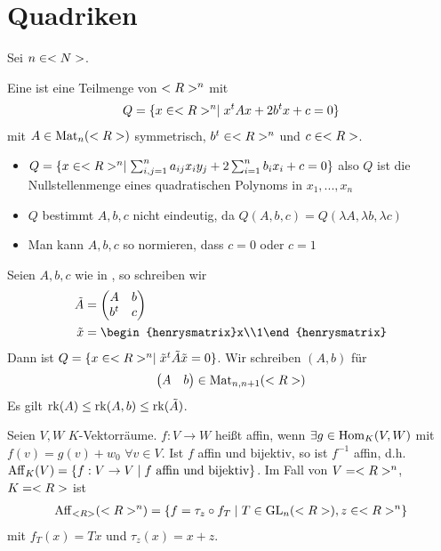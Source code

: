 \section{Quadriken}

Sei $n\in<N>$.

\begin{definition}[Quadrik]
	Eine  ist eine Teilmenge von $<R>^n$ mit
	\begin{align}
		Q=\{x\in<R>^n\mid x^tAx+2b^tx+c=0\}\notag
	\end{align}
	mit $A\in\operatorname{Mat}_n(<R>)$ symmetrisch, $b^t\in<R>^n$ und $c\in<R>$.
\end{definition}

\begin{remark}
	\begin{itemize}
		\item $Q=\{x\in<R>^n\mid \sum_{i,j=1}^n a_{ij}x_iy_j+2\sum_{i=1}^n b_ix_i+c=0\}$ also $Q$ ist die Nullstellenmenge eines quadratischen Polynoms in $x_1,...,x_n$
		\item $Q$ bestimmt $A,b,c$ nicht eindeutig, da $Q(A,b,c)=Q(\lambda A,\lambda b,\lambda c)$
		\item Man kann $A,b,c$ so normieren, dass $c=0$ oder $c=1$
	\end{itemize}
\end{remark}

\begin{remark}
	Seien $A,b,c$ wie in , so schreiben wir
	\begin{align}
		\tilde{A}&=\begin{pmatrix}A&b\\b^t&c\end{pmatrix}\notag \\
		\tilde{x}&=\begin{henrysmatrix}x\\1\end{henrysmatrix}\notag
	\end{align}
	Dann ist $Q=\{x\in<R>^n\mid \tilde{x}^t\tilde{A}\tilde{x}=0\}$. Wir schreiben $(A,b)$ für 
	\begin{align}
		\begin{pmatrix}A&b\end{pmatrix}\in\operatorname{Mat}_{n,n+1}(<R>)\notag
	\end{align}
	Es gilt $\operatorname{rk}(A)\le \operatorname{rk}(A,b)\le \operatorname{rk}(\tilde{A})$.
\end{remark}

\begin{remark}[Wiederholung]
	Seien $V,W$ $K$-Vektorräume. $f:V\to W$ heißt affin, wenn $\exists g\in\operatorname{Hom}_K(V,W)$ mit $f(v)=g(v)+w_0$ $\forall v\in V$. Ist $f$ affin und bijektiv, so ist $f^{-1}$ affin, d.h. $\operatorname{Aff}_K(V)=\{f:V\to V\mid f\text{ affin und bijektiv}\}$. Im Fall von $V=<R>^n$, $K=<R>$ ist
	\begin{align}
		\operatorname{Aff}_{<R>}(<R>^n)=\{f=\tau_z\circ f_T\mid T\in\operatorname{GL}_n(<R>),z\in<R>^n\}\notag
	\end{align}
	mit $f_T(x)=Tx$ und $\tau_z(x)=x+z$.
\end{remark}

